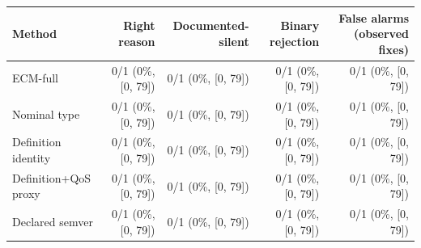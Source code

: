 \begin{tabular}{@{}lrrrr@{}}
\toprule
Method & Right reason & Documented-silent & Binary rejection & False alarms (observed fixes) \\
\midrule
ECM-full & 0/1 (0\%, [0, 79]) & 0/1 (0\%, [0, 79]) & 0/1 (0\%, [0, 79]) & 0/1 (0\%, [0, 79]) \\
Nominal type & 0/1 (0\%, [0, 79]) & 0/1 (0\%, [0, 79]) & 0/1 (0\%, [0, 79]) & 0/1 (0\%, [0, 79]) \\
Definition identity & 0/1 (0\%, [0, 79]) & 0/1 (0\%, [0, 79]) & 0/1 (0\%, [0, 79]) & 0/1 (0\%, [0, 79]) \\
Definition+QoS proxy & 0/1 (0\%, [0, 79]) & 0/1 (0\%, [0, 79]) & 0/1 (0\%, [0, 79]) & 0/1 (0\%, [0, 79]) \\
Declared semver & 0/1 (0\%, [0, 79]) & 0/1 (0\%, [0, 79]) & 0/1 (0\%, [0, 79]) & 0/1 (0\%, [0, 79]) \\
\bottomrule
\end{tabular}